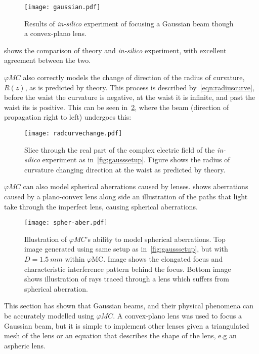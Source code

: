 \begin{figure}[!htpb]
    \centering
    \texttt{[image: gaussian.pdf]}
    \caption{Results of \textit{in-silico} experiment of focusing a Gaussian beam though a convex-plano lens.}
    \label{fig:simgaussexp}
\end{figure}


 shows the comparison of theory and \textit{in-silico} experiment, with excellent agreement between the two.

$\varphi MC$ also correctly models the change of direction of the radius of curvature, $R(z)$, as is predicted by theory.
This process is described by~\cref{eqn:radiuscurve}, before the waist the curvature is negative, at the waist it is infinite, and past the waist its is positive.
This can be seen in~\cref{fig:proofchgrz}, where the beam (direction of propagation right to left) undergoes this:

\begin{figure}[!htpb]
    \centering
    \texttt{[image: radcurvechange.pdf]}
    \caption{Slice through the real part of the complex electric field of the \textit{in-silico} experiment as in~\cref{fig:gausssetup}. Figure shows the radius of curvature changing direction at the waist as predicted by theory.}
    \label{fig:proofchgrz}
\end{figure}

$\varphi MC$ can also model spherical aberrations caused by lenses.
 shows aberrations caused by a plano-convex lens along side an illustration of the paths that light take through the imperfect lens, causing spherical aberrations.

\begin{figure}[!hbtp]
    \centering
    \texttt{[image: spher-aber.pdf]}
    \caption{Illustration of $\varphi MC$'s ability to model spherical aberrations. Top image generated using same setup as in~\cref{fig:gausssetup}, but with $D=1.5~mm$ within $\varphi$MC. Image shows the elongated focus and characteristic interference pattern behind the focus. Bottom image shows illustration of rays traced through a lens which suffers from spherical aberration.}
    \label{fig:spheraberr}
\end{figure}


This section has shown that Gaussian beams, and their physical phenomena can be accurately modelled using $\varphi MC$.
A convex-plano lens was used to focus a Gaussian beam, but it is simple to implement other lenses given a triangulated mesh of the lens or an equation that describes the shape of the lens, e.g an aspheric lens.
\FloatBarrier

